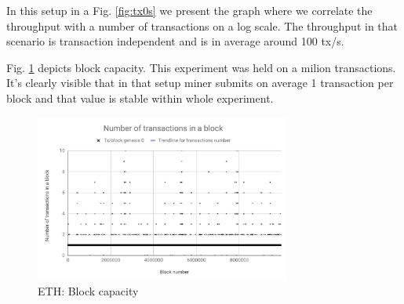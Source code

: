 In this setup in a Fig. \ref{fig:tx0s} we present the graph where we correlate the throughput with a number of transactions on a log scale. The throughput in that scenario is transaction independent and is in average around 100 tx/s.

Fig. \ref{fig:cap} depicts block capacity. This experiment was held on a milion transactions. It's clearly visible that in that setup miner submits on average 1 transaction per block and that value is stable within whole experiment.

\begin{figure}[!h]
    \centering
    \includegraphics[width=0.75\textwidth]{img/blockCap0s.png}
   \caption{ETH: Block capacity}
   \label{fig:cap}
\end{figure}